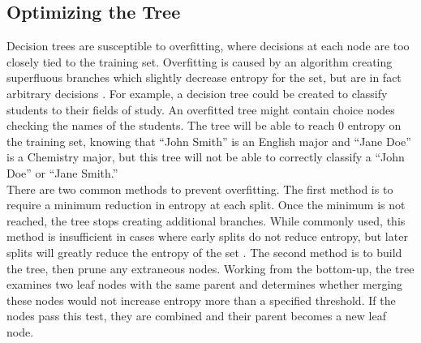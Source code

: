 \subsection{Optimizing the Tree}
Decision trees are susceptible to overfitting, where decisions at each node are too closely tied to the training set. Overfitting is caused by an algorithm creating superfluous branches which slightly decrease entropy for the set, but are in fact arbitrary decisions \cite{sega07}. For example, a decision tree could be created to classify students to their fields of study. An overfitted tree might contain choice nodes checking the names of the students. The tree will be able to reach 0 entropy on the training set, knowing that ``John Smith'' is an English major and ``Jane Doe'' is a Chemistry major, but this tree will not be able to correctly classify a ``John Doe'' or ``Jane Smith.''\\

There are two common methods to prevent overfitting. The first method is to require a minimum reduction in entropy at each split. Once the minimum is not reached, the tree stops creating additional branches. While commonly used, this method is insufficient in cases where early splits do not reduce entropy, but later splits will greatly reduce the entropy of the set \cite{sega07}. The second method is to build the tree, then prune any extraneous nodes. Working from the bottom-up, the tree examines two leaf nodes with the same parent and determines whether merging these nodes would not increase entropy more than a specified threshold. If the nodes pass this test, they are combined and their parent becomes a new leaf node.\\

